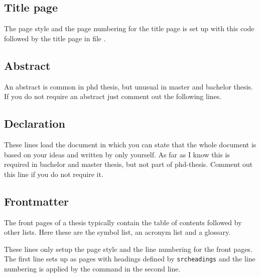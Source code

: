 \subsection{Title page}
\label{sec:document:title}
The page style and the page numbering for the title page is set up with this code
%
followed by the title page in file .

\subsection{Abstract}
\label{sec:document:abstract}

An abstract is common in phd thesis, but unusual in master and bachelor thesis. If you do not require an abstract just comment out the following lines.

\subsection{Declaration}
\label{sec:document:declaration}

These lines load the document  in which you can state that the whole document is based on your ideas and written by only yourself. As far as I know this is required in bachelor and master thesis, but not part of phd-thesis. Comment out this line if you do not require it.

\subsection{Frontmatter}
\label{sec:document:frontmatter}

The front pages of a thesis typically contain the table of contents followed by other lists. Here these are the symbol list, an acronym list and a glossary.

These lines only setup the page style and the line numbering for the front pages. The first line sets up as pages with headings defined by \texttt{srcheadings} and the line numbering is applied by the command  in the second line.

